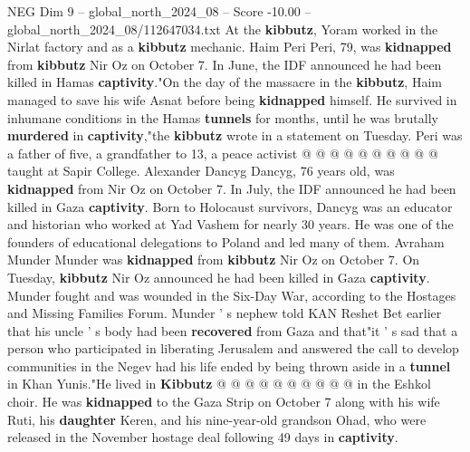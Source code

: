 \begin{textsample}{NEG Dim 9 – global\_north\_2024\_08 – Score -10.00 – global\_north\_2024\_08/112647034.txt}
At the \textbf{kibbutz}, Yoram worked in the Nirlat factory and as a \textbf{kibbutz} mechanic.
Haim Peri Peri, 79, was \textbf{kidnapped} from \textbf{kibbutz} Nir Oz on October 7.
In June, the IDF announced he had been killed in Hamas \textbf{captivity}."On the day of the massacre in the \textbf{kibbutz}, Haim managed to save his wife Asnat before being \textbf{kidnapped} himself.
He survived in inhumane conditions in the Hamas \textbf{tunnels} for months, until he was brutally \textbf{murdered} in \textbf{captivity},"the \textbf{kibbutz} wrote in a statement on Tuesday.
Peri was a father of five, a grandfather to 13, a peace activist @ @ @ @ @ @ @ @ @ @ taught at Sapir College.
Alexander Dancyg Dancyg, 76 years old, was \textbf{kidnapped} from Nir Oz on October 7.
In July, the IDF announced he had been killed in Gaza \textbf{captivity}.
Born to Holocaust survivors, Dancyg was an educator and historian who worked at Yad Vashem for nearly 30 years.
He was one of the founders of educational delegations to Poland and led many of them.
Avraham Munder Munder was \textbf{kidnapped} from \textbf{kibbutz} Nir Oz on October 7.
On Tuesday, \textbf{kibbutz} Nir Oz announced he had been killed in Gaza \textbf{captivity}.
Munder fought and was wounded in the Six-Day War, according to the Hostages and Missing Families Forum.
Munder ' s nephew told KAN Reshet Bet earlier that his uncle ' s body had been \textbf{recovered} from Gaza and that"it ' s sad that a person who participated in liberating Jerusalem and answered the call to develop communities in the Negev had his life ended by being thrown aside in a \textbf{tunnel} in Khan Yunis."He lived in \textbf{Kibbutz} @ @ @ @ @ @ @ @ @ @ in the Eshkol choir.
He was \textbf{kidnapped} to the Gaza Strip on October 7 along with his wife Ruti, his \textbf{daughter} Keren, and his nine-year-old grandson Ohad, who were released in the November hostage deal following 49 days in \textbf{captivity}.

\end{textsample}
